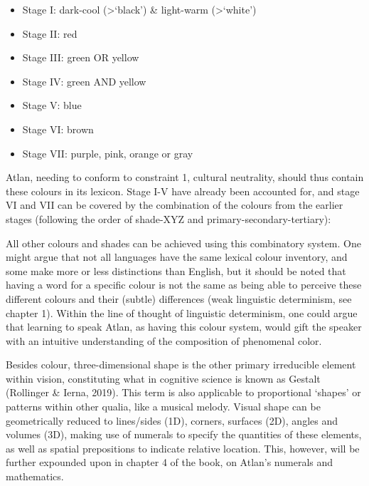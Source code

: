 \begin{itemize}
\item Stage I: dark-cool (>‘black’) \& light-warm (>‘white’) 

\item Stage II: red 

\item Stage III:  green OR yellow 

\item Stage IV:  green AND yellow 

\item Stage V:  blue 

\item Stage VI:  brown 

\item Stage VII:  purple, pink, orange or gray 
\end{itemize}

Atlan, needing to conform to constraint 1, cultural neutrality, should thus contain these colours in its lexicon. Stage I-V have already been accounted for, and stage VI and VII can be covered by the combination of the colours from the earlier stages (following the order of shade-XYZ and primary-secondary-tertiary): 


All other colours and shades can be achieved using this combinatory system. One might argue that not all languages have the same lexical colour inventory, and some make more or less distinctions than English, but it should be noted that having a word for a specific colour is not the same as being able to perceive these different colours and their (subtle) differences (weak linguistic determinism, see chapter 1). Within the line of thought of linguistic determinism, one could argue that learning to speak Atlan, as having this colour system, would gift the speaker with an intuitive understanding of the composition of phenomenal color. 

Besides colour, three-dimensional shape is the other primary irreducible element within vision, constituting what in cognitive science is known as Gestalt (Rollinger \& Ierna, 2019). This term is also applicable to proportional ‘shapes’ or patterns within other qualia, like a musical melody. Visual shape can be geometrically reduced to lines/sides (1D), corners, surfaces (2D), angles and volumes (3D), making use of numerals to specify the quantities of these elements, as well as spatial prepositions to indicate relative location. This, however, will be further expounded upon in chapter 4 of the book, on Atlan’s numerals and mathematics.  


